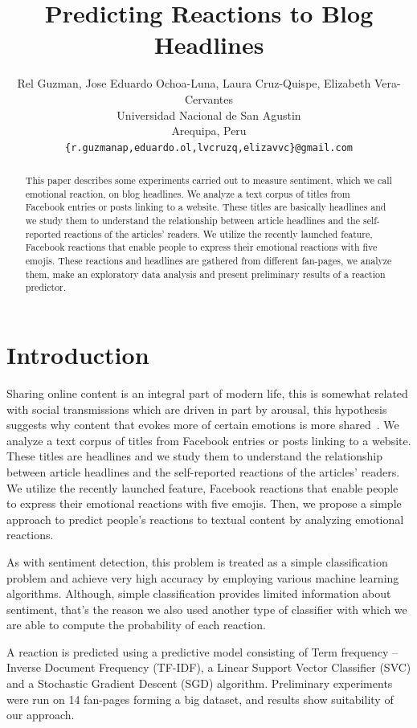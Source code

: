 \documentclass[11pt]{article}
\title{Predicting Reactions to Blog Headlines}
\author{Rel Guzman, Jose Eduardo Ochoa-Luna, Laura Cruz-Quispe, Elizabeth Vera-Cervantes \\
Universidad Nacional de San Agustin \\
Arequipa, Peru \\
  {\tt \{r.guzmanap,eduardo.ol,lvcruzq,elizavvc\}@gmail.com} \\}
\date{}
\begin{document}
\maketitle
\begin{abstract}

This paper describes some experiments carried out to measure sentiment, which we call emotional reaction, on blog headlines. We analyze a text corpus of titles from Facebook entries or posts linking to a website. These titles are basically headlines and we study them to understand the relationship between article headlines and the self-reported reactions of the articles' readers. We utilize the recently launched feature, Facebook reactions that enable people to express their emotional reactions with five emojis. These reactions and headlines are gathered from different fan-pages, we analyze them, make an exploratory data analysis and present preliminary results of a reaction predictor.

\end{abstract}


\section{Introduction}

Sharing online content is an integral part of modern life, this is somewhat related with social transmissions which are driven in part by arousal, this hypothesis suggests why content that evokes more of certain emotions is more shared~\cite{berger2011arousal}. We analyze a text corpus of titles from Facebook entries or posts linking to a website. These titles are headlines and we study them to understand the relationship between article headlines and the self-reported reactions of the articles' readers. We utilize the recently launched feature, Facebook reactions that enable people to express their emotional reactions with five emojis. Then, we propose a simple approach to predict people's reactions to textual content by analyzing emotional reactions. 

As with sentiment detection, this problem is treated as a simple classification problem and achieve very high accuracy by employing various machine learning algorithms. Although, simple classification provides limited information about sentiment, that's the reason we also used another type of classifier with which we are able to compute the probability of each reaction.

A reaction is predicted using a predictive model consisting of Term frequency – Inverse Document Frequency (TF-IDF), a Linear Support Vector Classifier (SVC) and a Stochastic Gradient Descent (SGD) algorithm. Preliminary experiments were run on 14 fan-pages forming a big dataset, and results show suitability of our approach. 
\end{document}
